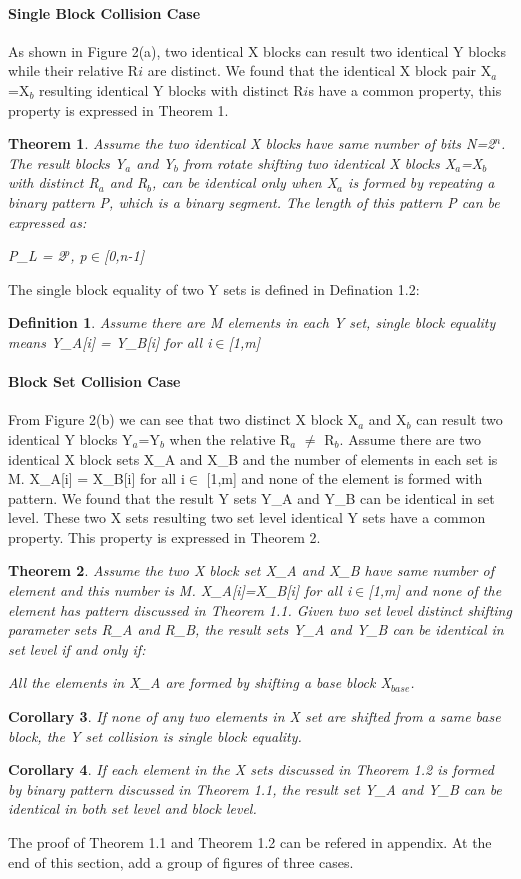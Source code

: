 \documentclass{article}
\newtheorem{theorem}{Theorem}[section]
\newtheorem{corollary}[theorem]{Corollary}
\newtheorem{defination}{Definition}[section]
\begin{document}
\paragraph{Single Block Collision Case}
As shown in Figure 2(a), two identical X blocks can result two identical Y blocks while their relative R$i$ are distinct. We found that the identical X block pair X$_a$=X$_b$ resulting identical Y blocks with distinct R$i$s have a common property, this property is expressed in Theorem 1.
\begin{theorem}
Assume the two identical X blocks have same number of bits N=2$^n$. The result blocks Y$_a$ and Y$_b$ from rotate shifting two identical X blocks X$_a$=X$_b$ with distinct R$_a$ and R$_b$, can be identical only when X$_a$ is formed by repeating a binary pattern P, which is a binary segment. The length of this pattern P can be expressed as:

	P\_L = 2$^p$, p$\in$[0,n-1]
\end{theorem}
The single block equality of two Y sets is defined in Defination 1.2:
\begin{defination}
Assume there are M elements in each Y set, single block equality means Y\_A[i] = Y\_B[i] for all i$\in$[1,m]
\end{defination} 
\paragraph{Block Set Collision Case}
From Figure 2(b) we can see that two distinct X block X$_a$ and X$_b$ can result two identical Y blocks Y$_a$=Y$_b$ when the relative R$_a$ $\neq$ R$_b$. Assume there are two identical X block sets X\_A and X\_B and the number of elements in each set is M. X\_A[i] = X\_B[i] for all i$\in$ [1,m] and none of the element is formed with pattern. We found that the result Y sets Y\_A and Y\_B can be identical in set level.  These two X sets resulting two set level identical Y sets have a common property. This property is expressed in Theorem 2.

\begin{theorem}
Assume the two X block set X\_A and X\_B have same number of element and this number is M. X\_A[i]=X\_B[i] for all i$\in$[1,m] and none of the element has pattern discussed in Theorem 1.1. Given two set level distinct shifting parameter sets R\_A and R\_B, the result sets Y\_A and Y\_B can be identical in set level if and only if:
	
	All the elements in X\_A are formed by shifting a base block X$_{base}$. 
\end{theorem}
\begin{corollary}
	If none of any two elements in X set are shifted from a same base block, the Y set collision is single block equality.
\end{corollary}
\begin{corollary}
	If each element in the X sets discussed in Theorem 1.2 is formed by binary pattern discussed in Theorem 1.1, the result set Y\_A and Y\_B can be identical in both set level and block level.
\end{corollary}
The proof of Theorem 1.1 and Theorem 1.2 can be refered in appendix.
At the end of this section, add a group of figures of three cases.
\end{document}

